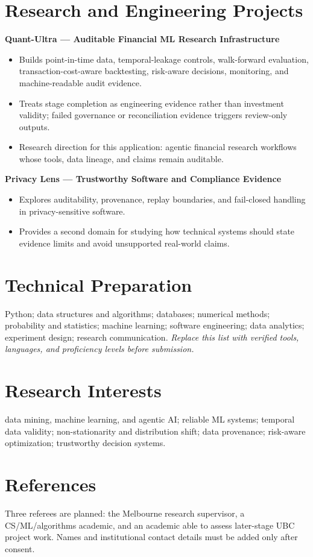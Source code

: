 \documentclass[11pt]{article}
\begin{document}
\section*{Research and Engineering Projects}
\textbf{Quant-Ultra --- Auditable Financial ML Research Infrastructure}
\begin{itemize}
\item Builds point-in-time data, temporal-leakage controls, walk-forward evaluation, transaction-cost-aware backtesting, risk-aware decisions, monitoring, and machine-readable audit evidence.
\item Treats stage completion as engineering evidence rather than investment validity; failed governance or reconciliation evidence triggers review-only outputs.
\item Research direction for this application: agentic financial research workflows whose tools, data lineage, and claims remain auditable.
\end{itemize}

\textbf{Privacy Lens --- Trustworthy Software and Compliance Evidence}
\begin{itemize}
\item Explores auditability, provenance, replay boundaries, and fail-closed handling in privacy-sensitive software.
\item Provides a second domain for studying how technical systems should state evidence limits and avoid unsupported real-world claims.
\end{itemize}

\section*{Technical Preparation}
Python; data structures and algorithms; databases; numerical methods; probability and statistics; machine learning; software engineering; data analytics; experiment design; research communication. \textit{Replace this list with verified tools, languages, and proficiency levels before submission.}

\section*{Research Interests}
data mining, machine learning, and agentic AI; reliable ML systems; temporal data validity; non-stationarity and distribution shift; data provenance; risk-aware optimization; trustworthy decision systems.

\section*{References}
Three referees are planned: the Melbourne research supervisor, a CS/ML/algorithms academic, and an academic able to assess later-stage UBC project work. Names and institutional contact details must be added only after consent.
\end{document}
